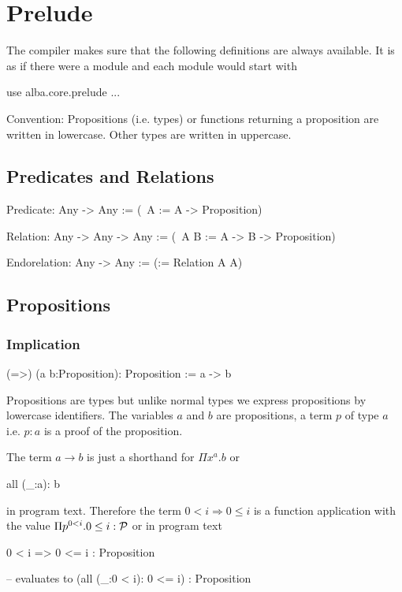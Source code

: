 \section{Prelude}
\label{sec:prelude}

The compiler makes sure that the following definitions are always
available. It is as if there were a module  and each
module would start with
\begin{alba}
  use
     alba.core.prelude
     ...
\end{alba}


Convention: Propositions (i.e. types) or functions returning a proposition are
written in lowercase. Other types are written in uppercase.





\subsection{Predicates and Relations}
\label{sec:predicates-and-relations}

\begin{alba}
  Predicate: Any -> Any
    := (\ A := A -> Proposition)

  Relation: Any -> Any -> Any
    := (\ A B := A -> B -> Proposition)

  Endorelation: Any -> Any
    := (\A := Relation A A)
\end{alba}
\vskip 2mm







\subsection{Propositions}
\label{sec:prelude-propositions}


\subsubsection{Implication}
%
\begin{alba}
  (=>) (a b:Proposition): Proposition
    := a -> b
\end{alba}

Propositions are types but unlike normal types we express propositions by
lowercase identifiers. The variables $a$ and $b$ are propositions, a term $p$
of type $a$ i.e. $p:a$ is a proof of the proposition.

The term $a\to b$ is just a shorthand for $\Pi x^a.b$ or
\begin{alba}
  all (_:a): b
\end{alba}
in program text. Therefore the term $0 < i \Rightarrow 0 \le i$ is a function
application with the value $\Pi p^{0 < i}. 0 \le i : {\cal{P}}$ or in program text
\begin{alba}
  0 < i => 0 <= i           : Proposition

  -- evaluates to
  (all (_:0 < i): 0 <= i)  : Proposition
\end{alba}
\vskip 2mm





